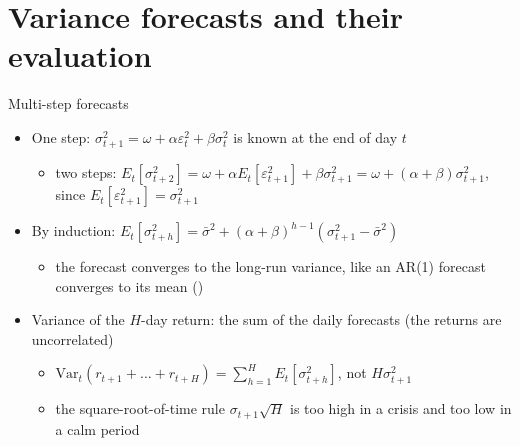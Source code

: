 \section{Variance forecasts and their evaluation}

\begin{frame}{Multi-step forecasts}
\itemsize{\small}
\begin{itemize}
    \item One step: $\sigma_{t+1}^2 = \omega + \alpha\varepsilon_t^2 + \beta\sigma_t^2$ is known at the end of day $t$
    \begin{itemize}
        \item two steps: $E_t[\sigma_{t+2}^2] = \omega + \alpha E_t[\varepsilon_{t+1}^2] + \beta\sigma_{t+1}^2 = \omega + (\alpha + \beta)\sigma_{t+1}^2$, since $E_t[\varepsilon_{t+1}^2] = \sigma_{t+1}^2$
    \end{itemize}
    \item By induction: $E_t[\sigma_{t+h}^2] = \bar\sigma^2 + (\alpha + \beta)^{h-1}(\sigma_{t+1}^2 - \bar\sigma^2)$
    \begin{itemize}
        \item the forecast converges to the long-run variance, like an AR(1) forecast converges to its mean ()
    \end{itemize}
    \item Variance of the $H$-day return: the sum of the daily forecasts (the returns are uncorrelated)
    \begin{itemize}
        \item $\mathrm{Var}_t(r_{t+1} + \dots + r_{t+H}) = \sum_{h=1}^{H} E_t[\sigma_{t+h}^2]$, not $H\sigma_{t+1}^2$
        \item the square-root-of-time rule $\sigma_{t+1}\sqrt{H}$ is too high in a crisis and too low in a calm period
    \end{itemize}
\end{itemize}
\end{frame}

